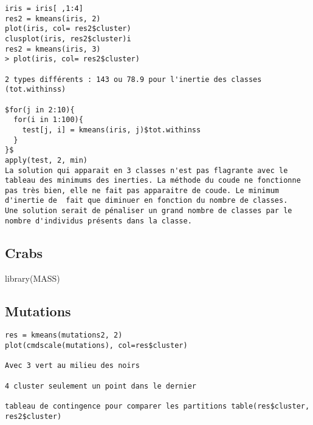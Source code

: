 \documentclass{article}\usepackage[]{graphicx}\usepackage[]{color}
\begin{document}
\begin{verbatim}
iris = iris[ ,1:4]
res2 = kmeans(iris, 2)
plot(iris, col= res2$cluster)
clusplot(iris, res2$cluster)i
res2 = kmeans(iris, 3)
> plot(iris, col= res2$cluster)

2 types différents : 143 ou 78.9 pour l'inertie des classes (tot.withinss)

$for(j in 2:10){
  for(i in 1:100){
    test[j, i] = kmeans(iris, j)$tot.withinss
  }
}$
apply(test, 2, min)
La solution qui apparait en 3 classes n'est pas flagrante avec le tableau des minimums des inerties. La méthode du coude ne fonctionne pas très bien, elle ne fait pas apparaitre de coude. Le minimum d'inertie de  fait que diminuer en fonction du nombre de classes. 
Une solution serait de pénaliser un grand nombre de classes par le nombre d'individus présents dans la classe.
\end{verbatim}

\subsection*{Crabs}

library(MASS)


\subsection*{Mutations}
\begin{verbatim}
res = kmeans(mutations2, 2)
plot(cmdscale(mutations), col=res$cluster)

Avec 3 vert au milieu des noirs 

4 cluster seulement un point dans le dernier

tableau de contingence pour comparer les partitions table(res$cluster, res2$cluster)
\end{verbatim}
\end{document}
